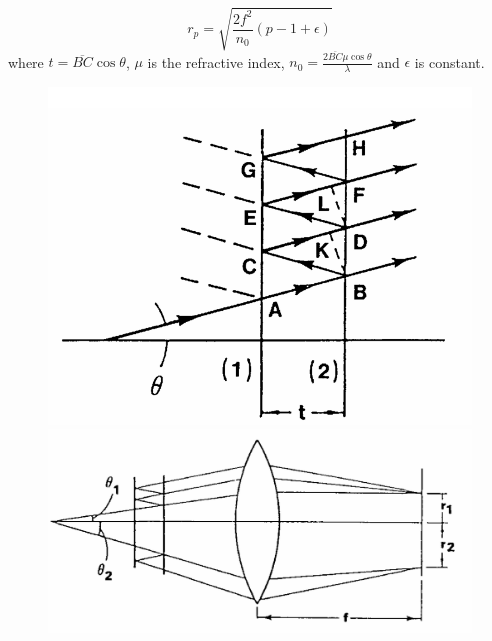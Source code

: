 \documentclass[a4paper,12pt]{article}
\begin{document}
    
    \begin{equation}
        r_p = \sqrt{\frac{2f^2}{n_0} (p-1+ \epsilon)}
        \label{eq:pth radius}
    \end{equation}
    where $t= \overline{BC} \cos{\theta}$, $\mu$ is the refractive index, $n_0 = \frac{2 \overline{BC} \mu \cos{\theta}}{\lambda}$ and $\epsilon$ is constant.
    
    
    \begin{figure}[H]
        \centering
        \begin{minipage}{0.45\textwidth}
            \centering
            \includegraphics[width=\linewidth]{reflection.png} 
            \caption{}
            \label{fig:reflection}
        \end{minipage}
        \hfill
        \begin{minipage}{0.45\textwidth}
            \centering
            \includegraphics[width=\linewidth]{faby-perot refraction.png}
            \caption{}
            \label{fig:fabry-perot}
        \end{minipage}
    \end{figure}
    
\end{document}
